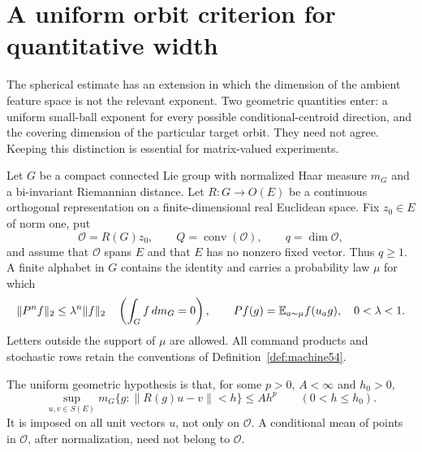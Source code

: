 \section{A uniform orbit criterion for quantitative width}\label{sec:uniform57}
The spherical estimate has an extension in which the dimension of the ambient feature space is not the relevant exponent. Two geometric quantities enter: a uniform small-ball exponent for every possible conditional-centroid direction, and the covering dimension of the particular target orbit. They need not agree. Keeping this distinction is essential for matrix-valued experiments.

Let $G$ be a compact connected Lie group with normalized Haar measure $m_G$ and a bi-invariant Riemannian distance. Let $R:G\to O(E)$ be a continuous orthogonal representation on a finite-dimensional real Euclidean space. Fix $z_0\in E$ of norm one, put
\[
 \mathcal O=R(G)z_0,\qquad Q=\operatorname{conv}(\mathcal O),
 \qquad q=\dim\mathcal O,
\]
and assume that $\mathcal O$ spans $E$ and that $E$ has no nonzero fixed vector. Thus $q\ge1$. A finite alphabet in $G$ contains the identity and carries a probability law $\mu$ for which
\begin{equation}\label{eq:groupgap57}
 \|P^nf\|_2\le\lambda^n\|f\|_2\quad\left(\int_Gf\,dm_G=0\right),
 \qquad Pf(g)=\mathbb E_{a\sim\mu}f(u_ag),\quad 0<\lambda<1.
\end{equation}
Letters outside the support of $\mu$ are allowed. All command products and stochastic rows retain the conventions of Definition~\ref{def:machine54}.

The uniform geometric hypothesis is that, for some $p>0$, $A<\infty$ and $h_0>0$,
\begin{equation}\label{eq:smallball57}
 \sup_{u,v\in S(E)}m_G\{g:\|R(g)u-v\|<h\}\le Ah^p
                      \qquad(0<h\le h_0).
\end{equation}
It is imposed on all unit vectors $u$, not only on $\mathcal O$. A conditional mean of points in $\mathcal O$, after normalization, need not belong to $\mathcal O$.

